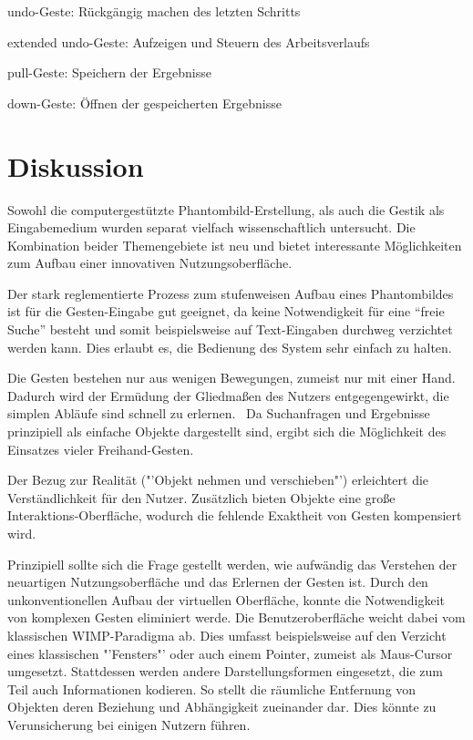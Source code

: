 \documentclass{sigchi-ext}
\begin{document}
undo-Geste: Rückgängig machen des letzten Schritts

extended undo-Geste: Aufzeigen und Steuern des Arbeitsverlaufs 

pull-Geste: Speichern der Ergebnisse

down-Geste: Öffnen der gespeicherten Ergebnisse

\section{Diskussion}
Sowohl die computergestützte Phantombild-Erstellung, als auch die
Gestik als Eingabemedium wurden separat vielfach wissenschaftlich
untersucht. Die Kombination beider Themengebiete ist neu und bietet
interessante Möglichkeiten zum Aufbau einer innovativen
Nutzungsoberfläche. 

Der stark reglementierte Prozess zum stufenweisen Aufbau eines
Phantombildes ist für die Gesten-Eingabe gut geeignet, da keine
Notwendigkeit für eine "`freie Suche"' besteht und somit beispielsweise auf
Text-Eingaben durchweg verzichtet werden kann. Dies erlaubt es, die Bedienung des
System sehr einfach zu halten.

Die Gesten bestehen nur aus wenigen Bewegungen, zumeist nur mit einer
Hand. Dadurch wird der Ermüdung der Gliedmaßen des Nutzers
entgegengewirkt, die simplen Abläufe sind schnell zu
erlernen.~\cite{vrs:book}
Da Suchanfragen und Ergebnisse prinzipiell
als einfache Objekte dargestellt sind, ergibt sich die Möglichkeit des
Einsatzes vieler Freihand-Gesten.~\cite{3dinteraction:book}

Der Bezug zur Realität ("'Objekt nehmen und verschieben"') erleichtert die
Verständlichkeit für den Nutzer. Zusätzlich bieten Objekte eine große
Interaktions-Oberfläche, wodurch die fehlende Exaktheit von Gesten
kompensiert wird.~\cite{vrs:book}

Prinzipiell sollte sich die Frage gestellt werden, wie aufwändig das Verstehen
der neuartigen Nutzungsoberfläche und das Erlernen der Gesten ist. 
Durch den unkonventionellen Aufbau der virtuellen Oberfläche, konnte die Notwendigkeit von komplexen Gesten eliminiert werde. Die Benutzeroberfläche weicht dabei vom klassischen WIMP-Paradigma ab. Dies umfasst beispielsweise auf den Verzicht eines klassischen "'Fensters"' oder auch einem Pointer, zumeist als Maus-Cursor umgesetzt. Stattdessen werden andere Darstellungsformen eingesetzt, die zum Teil auch Informationen kodieren. So stellt die räumliche Entfernung von Objekten deren Beziehung und Abhängigkeit zueinander dar. Dies könnte zu Verunsicherung bei einigen Nutzern führen.
\end{document}
